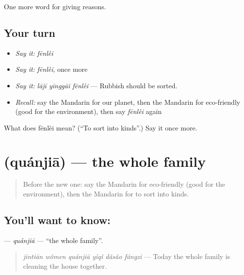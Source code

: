 \begin{grammarlens}[title={What you've built}]
One more word for giving reasons.
\end{grammarlens}

\subsection*{Your turn}
\begin{itemize}
\raggedright
  \item \emph{Say it:} \emph{fēnlèi}
  \item \emph{Say it:} \emph{fēnlèi}, once more
  \item \emph{Say it:} \emph{lājī yīnggāi fēnlèi} — Rubbish should be sorted.
  \item \emph{Recall:} say the Mandarin for our planet, then the Mandarin for eco-friendly (good for the environment), then say \emph{fēnlèi} again
\end{itemize}

\begin{tcolorbox}[breakable,colback=teal!4,colframe=teal!35!black,title={Before you move on}]
What does fēnlèi mean? (\textquotedblleft{}To sort into kinds\textquotedblright{}.) Say it once more.
\end{tcolorbox}
\section[\texorpdfstring{\zh{全家} (quánjiā)}{全家 (quánjiā)}]{ (quánjiā) — the whole family}

\label{lesson:ZH-C381-quanjia}



\begin{quote}
Before the new one: say the Mandarin for eco-friendly (good for the environment), then the Mandarin for to sort into kinds.
\end{quote}

\subsection*{You'll want to know: }
\textbf{} — \emph{quánjiā} — \textquotedblleft{}the whole family\textquotedblright{}.

\begin{quote}
\textbf{} \emph{jīntiān wǒmen quánjiā yìqǐ dǎsǎo fángzi} — Today the whole family is cleaning the house together.
\end{quote}

